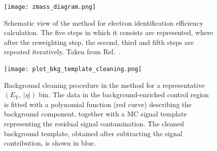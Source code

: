 \begin{figure}[htbp]
  \centering
  \texttt{[image: zmass\_diagram.png]}
  \caption{Schematic view of the \zmass method for electron identification efficiency calculation. The five steps in which it consists are represented, where after the reweighting step, the second, third and fifth steps are repeated iteratively. Taken from Ref.~\cite{elias_thesis}. }
  \label{fig:zmass_algo}
\end{figure}

\begin{figure}[htbp]
  \centering
  \texttt{[image: plot\_bkg\_template\_cleaning.png]}
  \caption{Background cleaning procedure in the \zmass method for a representative $(E_{\mathrm{T}},\,|\eta|)$ bin. The data in the background-enriched control region is fitted with a polynomial function (red curve) describing the background component, together with a MC signal template representing the residual signal contamination. The cleaned background template, obtained after subtracting the signal contribution, is shown in blue.}
  \label{fig:bkg_clean}
\end{figure}

